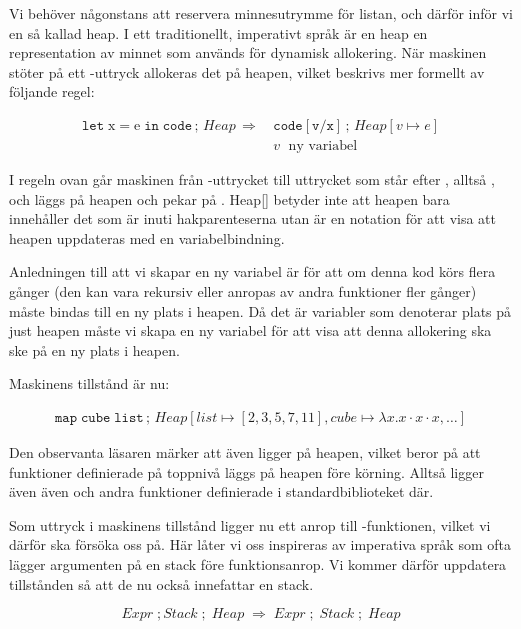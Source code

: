 \documentclass[../Core]{subfiles}
\begin{document}
Vi behöver någonstans att reservera minnesutrymme för listan, och därför
inför vi en så kallad heap. I ett traditionellt, imperativt språk är
en heap en representation av minnet som används för dynamisk allokering. När
maskinen stöter på ett -uttryck allokeras det på heapen, vilket
beskrivs mer formellt av följande regel:

\begin{align*}
\mathtt{let\;\mathrm{x\mathtt{=}e}\; in\; code}\,;\, Heap\,\Rightarrow\, & \mathtt{code[v/x]}\,;\, Heap[v\mapsto e] \\
 & v\; \text{ ny variabel} \nonumber
\end{align*}

I regeln ovan går maskinen från -uttrycket till
uttrycket som står efter , alltså ,
och  läggs på heapen och pekar på .
Heap{[}{]} betyder inte att heapen bara innehåller det som är inuti
hakparenteserna utan är en notation för att visa att heapen
uppdateras med en variabelbindning.

Anledningen till att vi skapar en ny variabel  är för att om
denna kod körs flera gånger (den kan vara rekursiv eller anropas av andra funktioner
fler gånger) måste  bindas till en ny plats i heapen. Då det är variabler som
denoterar plats på just heapen måste vi skapa en ny variabel för att visa att denna
allokering ska ske på en ny plats i heapen.

Maskinens tillstånd är nu:

\begin{align*}
\mathtt{map\; cube\; list}\,;\, Heap[list\mapsto[2,3,5,7,11],cube\mapsto\lambda x.x\cdot x\cdot x,\ldots]
\end{align*}


Den observanta läsaren märker att även  ligger på heapen, vilket
beror på att funktioner definierade på toppnivå läggs på heapen före körning.
Alltså ligger även även  och andra funktioner definierade
i standardbiblioteket där.

Som uttryck i maskinens tillstånd ligger nu ett anrop till
-funktionen, vilket vi därför ska försöka oss på.
Här låter vi oss inspireras av imperativa språk som ofta lägger argumenten
på en stack före funktionsanrop. Vi kommer därför uppdatera tillstånden så att de
nu också innefattar en stack.

\begin{equation*} 
Expr \; ; Stack \; ; \; Heap \; \Rightarrow \; Expr \; ; \; Stack \; ; \; Heap
\end{equation*} 
\end{document}
